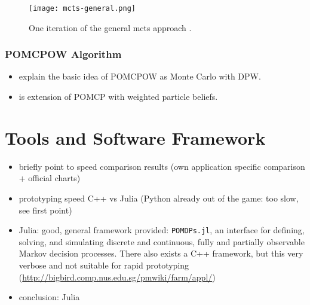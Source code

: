 \begin{figure}[htpb]
  \centering
  \texttt{[image: mcts-general.png]}
  \caption{One iteration of the general \ac{mcts} approach
  \cite{browne2012survey}.}
  \label{fig:mcts-general}
\end{figure}

\subsubsection{POMCPOW Algorithm}

\begin{itemize}
  \item explain the basic idea of POMCPOW as Monte Carlo with DPW.
  \item is extension of POMCP with weighted particle beliefs.
\end{itemize}



\section{Tools and Software Framework}

\begin{itemize}
  \item briefly point to speed comparison results (own application specific comparison + official charts)
  \item prototyping speed C++ vs Julia (Python already out of the game: too slow, see first point)
  \item Julia: good, general framework provided: \texttt{POMDPs.jl}, an interface for
  defining, solving, and simulating discrete and continuous, fully and
  partially observable Markov decision processes.  \cite{egorov2017pomdps}
  There also exists a C++ framework, but this very verbose and not suitable for
  rapid prototyping (\url{http://bigbird.comp.nus.edu.sg/pmwiki/farm/appl/})
  \item conclusion: Julia \cite{bezanson2017julia}
\end{itemize}

